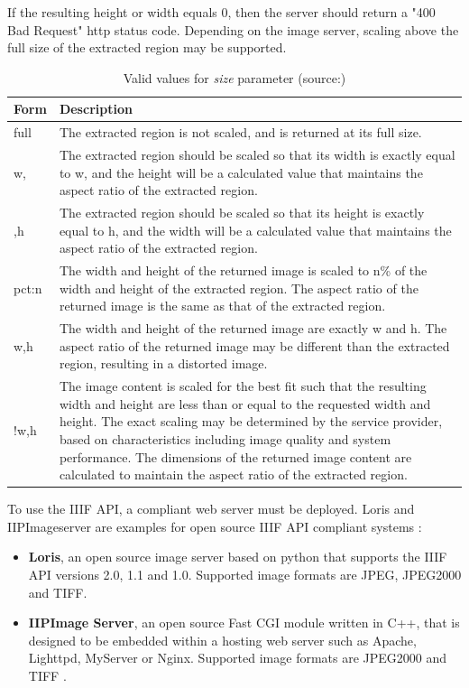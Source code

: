 If the resulting height or width equals 0, then the server should return a "400 Bad Request" http status code. Depending on the image server, scaling above the full size of the extracted region may be supported\cite{web:iiif}.

\begin{table}[H]
	\begin{center}
		\begin{tabular}{| p{2cm} | p{9cm} |}
			\hline
			\textbf{Form} & \textbf{Description}\\ \hline
			full & The extracted region is not scaled, and is returned at its full size.\\ \hline
			w, & The extracted region should be scaled so that its width is exactly equal to w, and the height will be a calculated value that maintains the aspect ratio of the extracted region.\\ \hline
			,h & The extracted region should be scaled so that its height is exactly equal to h, and the width will be a calculated value that maintains the aspect ratio of the extracted region.\\ \hline
			pct:n & The width and height of the returned image is scaled to n\% of the width and height of the extracted region. The aspect ratio of the returned image is the same as that of the extracted region.\\ \hline
			w,h & The width and height of the returned image are exactly w and h. The aspect ratio of the returned image may be different than the extracted region, resulting in a distorted image.\\ \hline
			!w,h & The image content is scaled for the best fit such that the resulting width and height are less than or equal to the requested width and height. The exact scaling may be determined by the service provider, based on characteristics including image quality and system performance. The dimensions of the returned image content are calculated to maintain the aspect ratio of the extracted region.\\ \hline
		\end{tabular}
		\caption{Valid values for \emph{size} parameter (source:\cite{web:iiif})}
		\label{tab2_sizeParam}
	\end{center}
\end{table}

To use the IIIF API, a compliant web server must be deployed.
Loris and IIPImageserver are examples for open source IIIF API compliant systems \cite{web:openseadragon}:
\begin{itemize}
	\item \textbf{Loris}, an open source image server based on python that supports the IIIF API versions 2.0, 1.1 and 1.0. Supported image formats are JPEG, JPEG2000 and TIFF.
	\item \textbf{IIPImage Server}, an open source Fast CGI module written in C++, that is designed to be embedded within a hosting web server such as Apache, Lighttpd, MyServer or Nginx. Supported image formats are JPEG2000 and TIFF \cite{web:iiif2}.
\end{itemize}

